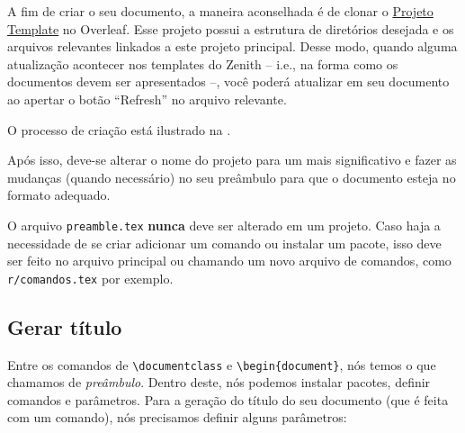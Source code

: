 \documentclass[brazilian, 11pt, oneside, a4paper]{article}
\begin{document}
A fim de criar o seu documento, a maneira aconselhada é de clonar o \href{https://www.overleaf.com/6265616139jqnrtzxkvzvp}{Projeto Template}
no Overleaf. Esse projeto possui a estrutura de diretórios desejada e os arquivos relevantes linkados a este projeto principal. Desse modo, quando alguma atualização acontecer nos templates do Zenith -- i.e., na forma como os documentos devem ser apresentados --, você poderá atualizar em seu documento ao apertar o botão ``Refresh'' no arquivo relevante.

O processo de criação está ilustrado na .


Após isso, deve-se alterar o nome do projeto para um mais significativo e fazer as mudanças (quando necessário) no seu preâmbulo para que o documento esteja no formato adequado.

O arquivo \verb$preamble.tex$ \textbf{nunca} deve ser alterado em um projeto. Caso haja a necessidade de se criar adicionar um comando ou instalar um pacote, isso deve ser feito no arquivo principal ou chamando um novo arquivo de comandos, como \verb$r/comandos.tex$ por exemplo.

\subsection{Gerar título}

Entre os comandos de \verb$\documentclass$ e \verb$\begin{document}$, nós temos o que chamamos de \textit{preâmbulo}. Dentro deste, nós podemos instalar pacotes, definir comandos e parâmetros. Para a geração do título do seu documento (que é feita com um comando), nós precisamos definir alguns parâmetros:
\end{document}
